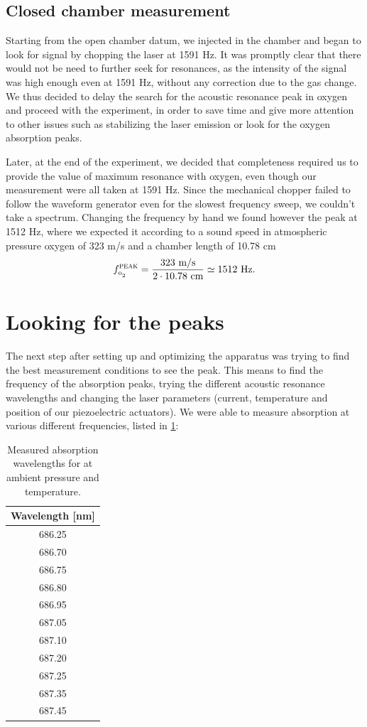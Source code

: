 		\subsection{Closed chamber measurement}
Starting from the open chamber datum, we injected  in the chamber and began to look for signal by chopping the laser at 1591 Hz. It was promptly clear that there would not be need to further seek for resonances, as the intensity of the signal was high enough even at 1591 Hz, without any correction due to the gas change. We thus decided to delay the search for the acoustic resonance peak in oxygen and proceed with the experiment, in order to save time and give more attention to other issues such as stabilizing the laser emission or look for the oxygen absorption peaks.

Later, at the end of the experiment, we decided that completeness required us to provide the value of maximum resonance with oxygen, even though our measurement were all taken at 1591 Hz. Since the mechanical chopper failed to follow the waveform generator even for the slowest frequency sweep, we couldn't take a spectrum. Changing the frequency by hand we found however the peak at 1512 Hz, where we expected it according to a sound speed in atmospheric pressure oxygen of 323 m/s and a chamber length of 10.78 cm$$f^{\mai{peak}}_{\ce{o2}}=\frac{323\mbox{ m/s}}{2\cdot10.78\mbox{ cm}}\simeq1512\mbox{ Hz.}$$

\section{Looking for the \texorpdfstring{}{oxygen} peaks}\label{oxygen}
The next step after setting up and optimizing the apparatus was trying to find the best measurement conditions to see the peak. This means to find the frequency of the  absorption peaks, trying the different acoustic resonance wavelengths and changing the laser parameters (current, temperature and position of our piezoelectric actuators). 
We were able to measure absorption at various different frequencies, listed in \cref{oxypeaks}:

\begin{table}\centering
\begin{tabular}{|c|}
\hline Wavelength [nm]\\ \hline
686.25 \\ \hline
686.70 \\ \hline
686.75 \\ \hline
686.80 \\ \hline
686.95 \\ \hline
687.05 \\ \hline
687.10 \\ \hline
687.20 \\ \hline
687.25 \\ \hline
687.35 \\ \hline
687.45 \\ \hline
\end{tabular}
\caption{Measured absorption wavelengths for  at ambient pressure and temperature.}
\label{oxypeaks}
\end{table}

